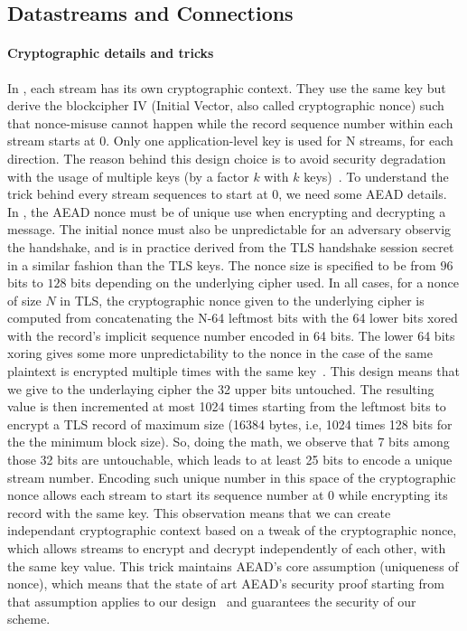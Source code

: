 \subsection{Datastreams and \tcp Connections}
\label{sec:datastreams}

\paragraph*{Cryptographic details and tricks}
In \tcpls, each stream has its own cryptographic context. They use the same key
but derive the blockcipher IV (Initial Vector, also called cryptographic nonce)
such that nonce-misuse cannot happen while the record sequence number within
each stream starts at 0. Only one application-level key is used for N streams,
for each direction.  The reason behind this design choice is to avoid security
degradation with the usage of multiple keys (by a factor $k$ with $k$
keys)~\cite{chatterjee2011another}. To understand the trick behind every
stream sequences to start at 0, we need some AEAD details. In \tcpls, the AEAD
nonce must be of unique use when encrypting and decrypting a message. The
initial nonce must also be unpredictable for an adversary observig the
handshake, and is in practice derived from the TLS handshake session secret in a
similar fashion than the TLS keys. The nonce size is specified to be from $96$
bits to $128$ bits depending on the underlying cipher used. In all cases, for a
nonce of size $N$ in TLS, the cryptographic nonce given to the underlying cipher
is computed from concatenating the N-64 leftmost bits with the 64 lower bits xored
with the record's implicit sequence number encoded in 64 bits. The lower 64 bits
xoring gives some more unpredictability to the nonce in the case of the same
plaintext is encrypted multiple times with the same key~\cite{bellare2016multi,
  hoang2018multi}. This design means that we give to the underlaying cipher the
32 upper bits untouched. The resulting value is then incremented at most 1024
times starting from the leftmost bits to encrypt a TLS record of maximum size
(16384 bytes, i.e, 1024 times 128 bits for the the minimum block size). So,
doing the math, we observe that 7 bits among those 32 bits are untouchable,
which leads to at least 25 bits to encode a unique stream number. Encoding such
unique number in this space of the cryptographic nonce allows each stream to
start its sequence number at 0 while encrypting its record with the same key.
This observation means that we can create independant cryptographic context
based on a tweak of the cryptographic nonce, which allows streams to encrypt and
decrypt independently of each other, with the same key value. This trick
maintains AEAD's core assumption (uniqueness of nonce), which means that the
state of art AEAD's security proof starting from that assumption applies to our
design~\cite{chatterjee2011another} and guarantees the security of our scheme.

